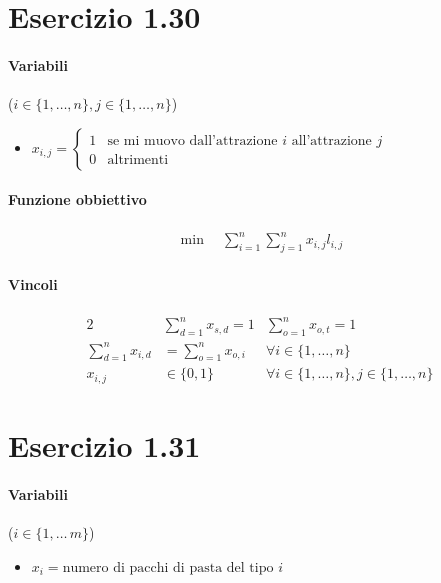 \documentclass{article}
\begin{document}
\pagebreak
\section{Esercizio 1.30}

\paragraph{Variabili} ($i \in \{1,\ldots,n\}, j \in \{1,\ldots,n\}$)
\begin{itemize}
  \item $x_{i,j} = \begin{cases}
      1 & \text{se mi muovo dall'attrazione }i\text{ all'attrazione }j \\
      0 & \text{altrimenti}
  \end{cases}$
\end{itemize}

\paragraph{Funzione obbiettivo}
\begin{align*}
  \min \quad \sum_{i=1}^n \sum_{j=1}^n x_{i,j} l_{i,j}
\end{align*}

\paragraph{Vincoli}
\begin{alignat}{2}
  &\sum_{d=1}^n x_{s,d} = 1 &\sum_{o=1}^n x_{o,t} = 1 \\
  \sum_{d=1}^n x_{i,d} &= \sum_{o=1}^n x_{o,i} &\forall i \in \{1,\ldots,n\}\\
  x_{i,j} &\in \{0,1\} &\forall i\in \{1,\ldots,n\}, j \in \{1,\ldots,n\}
\end{alignat}

\pagebreak
\section{Esercizio 1.31}

\paragraph{Variabili} ($i \in \{1,\ldots\,m\}$)
\begin{itemize}
  \item $x_i = \text{numero di pacchi di pasta del tipo }i$
\end{itemize}
\end{document}
